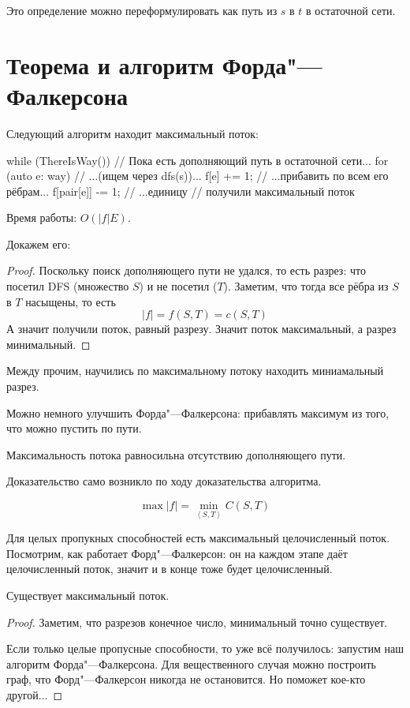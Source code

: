 Это определение можно переформулировать как путь из $s$ в $t$ в остаточной сети.

\section{Теорема и алгоритм Форда"---Фалкерсона}

Следующий алгоритм находит максимальный поток:
\begin{cppcode}
while (ThereIsWay()) {    // Пока есть дополняющий путь в остаточной сети...
	for (auto e: way) {   // ...(ищем через dfs(s))...
		f[e] += 1;        // ...прибавить по всем его рёбрам...
		f[pair[e]] -= 1;  // ...единицу
	}
}
// получили максимальный поток
\end{cppcode}
Время работы: $O(|f| E)$.

Докажем его:
\begin{proof}
	Поскольку поиск дополняющего пути не удался, то есть разрез: что посетил DFS (множество $S$) и не посетил ($T$).
	Заметим, что тогда все рёбра из $S$ в $T$ насыщены, то есть
	\[ |f| = f(S, T) = c(S, T) \]
	А значит получили поток, равный разрезу.
	Значит поток максимальный, а разрез минимальный.
\end{proof}
Между прочим, научились по максимальному потоку находить миниамальный разрез.

Можно немного улучшить Форда"---Фалкерсона: прибавлять максимум из того, что можно пустить по пути.

\begin{theorem}
	Максимальность потока равносильна отсутствию дополняющего пути.
\end{theorem}
Доказательство само возникло по ходу доказательства алгоритма.

\begin{conseq}
	\[ \max |f| = \min_{\left<S, T\right>} C(S, T) \]
\end{conseq}

\begin{Rem}
	Для целых пропукных способностей есть максимальный целочисленный поток.
	Посмотрим, как работает Форд"---Фалкерсон: он на каждом этапе даёт целочисленный поток, значит и в конце тоже будет целочисленный.
\end{Rem}

\begin{lemma}
	Существует максимальный поток.
\end{lemma}
\begin{proof}
	Заметим, что разрезов конечное число, минимальный точно существует.

	Если только целые пропусные способности, то уже всё получилось: запустим наш алгоритм Форда"---Фалкерсона.
	Для вещественного случая можно построить граф, что Форд"---Фалкерсон никогда не остановится.
	Но поможет кое-кто другой...
\end{proof}

